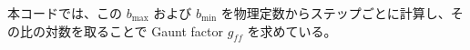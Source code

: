 \documentclass[a4paper,11pt]{bxjsarticle} %
\begin{document}
本コードでは、この $b_{\max}$ および $b_{\min}$ を物理定数からステップごとに計算し、その比の対数を取ることで Gaunt factor $g_{ff}$ を求めている。








\end{document}
